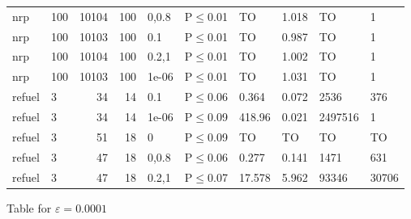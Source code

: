 \begin{longtable}{llrrllllll}
 nrp           & 100       &  	10104 &  100 & 0,0.8 & P$\leq$0.01  & TO       & 1.018    & TO      & 1      \\
 nrp           & 100       &  	10103 &  100 & 0.1   & P$\leq$0.01  & TO       & 0.987    & TO      & 1      \\
 nrp           & 100       &  	10104 &  100 & 0.2,1 & P$\leq$0.01  & TO       & 1.002    & TO      & 1      \\
 nrp           & 100       &  	10103 &  100 & 1e-06 & P$\leq$0.01  & TO       & 1.031    & TO      & 1      \\
 refuel        & 3         &     	34 &   14 & 0.1   & P$\leq$0.06  & 0.364    & 0.072    & 2536    & 376    \\
 refuel        & 3         &     	34 &   14 & 1e-06 & P$\leq$0.09  & 418.96   & 0.021    & 2497516 & 1      \\
 refuel        & 3         &     	51 &   18 & 0     & P$\leq$0.09  & TO       & TO       & TO      & TO     \\
 refuel        & 3         &     	47 &   18 & 0,0.8 & P$\leq$0.06  & 0.277    & 0.141    & 1471    & 631    \\
 refuel        & 3         &     	47 &   18 & 0.2,1 & P$\leq$0.07  & 17.578   & 5.962    & 93346   & 30706  \\
\bottomrule
\end{longtable}
\small Table for \(\varepsilon=0.0001\)
